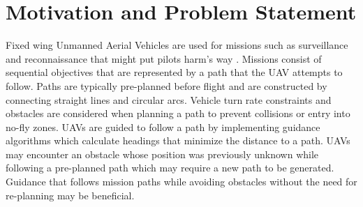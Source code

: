 \documentclass[numbered,pdftex]{ohio-etd}
\begin{document}
\section{Motivation and Problem Statement}
Fixed wing Unmanned Aerial Vehicles are used for missions such as surveillance and reconnaissance that might put pilots harm’s way \cite{bone_uavs_2003}. Missions consist of sequential objectives that are represented by a path that the UAV attempts to follow. Paths are typically pre-planned before flight and are constructed by connecting straight lines and circular arcs. Vehicle turn rate constraints and obstacles are considered when planning a path to prevent collisions or entry into no-fly zones. UAVs are guided to follow a path by implementing guidance algorithms which calculate headings that minimize the distance to a path. UAVs may encounter an obstacle whose position was previously unknown while following a pre-planned path which may require a new path to be generated. Guidance that follows mission paths while avoiding obstacles without the need for re-planning may be beneficial. 
\\
\end{document}

